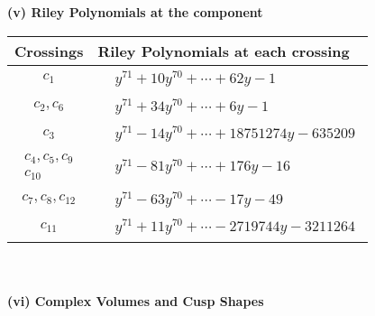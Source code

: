 \documentclass[1p]{elsarticle_modified}
\theoremstyle{definition}
\begin{document}
\newpage\renewcommand{\arraystretch}{1}
\flushleft \textbf{(v) Riley Polynomials at the component}\newline \\
\begin{tabular}{m{50pt}|m{274pt}}
Crossings & \hspace{64pt}Riley Polynomials at each crossing \\
\hline $$\begin{aligned}c_{1}\end{aligned}$$&$\begin{aligned}
&y^{71}+10 y^{70}+\cdots+62 y-1
\end{aligned}$\\
\hline $$\begin{aligned}c_{2},c_{6}\end{aligned}$$&$\begin{aligned}
&y^{71}+34 y^{70}+\cdots+6 y-1
\end{aligned}$\\
\hline $$\begin{aligned}c_{3}\end{aligned}$$&$\begin{aligned}
&y^{71}-14 y^{70}+\cdots+18751274 y-635209
\end{aligned}$\\
\hline $$\begin{aligned}c_{4},c_{5},c_{9}\\c_{10}\end{aligned}$$&$\begin{aligned}
&y^{71}-81 y^{70}+\cdots+176 y-16
\end{aligned}$\\
\hline $$\begin{aligned}c_{7},c_{8},c_{12}\end{aligned}$$&$\begin{aligned}
&y^{71}-63 y^{70}+\cdots-17 y-49
\end{aligned}$\\
\hline $$\begin{aligned}c_{11}\end{aligned}$$&$\begin{aligned}
&y^{71}+11 y^{70}+\cdots-2719744 y-3211264
\end{aligned}$\\
\hline
\end{tabular}\\~\\
\newpage\flushleft \textbf{(vi) Complex Volumes and Cusp Shapes}
\end{document}
